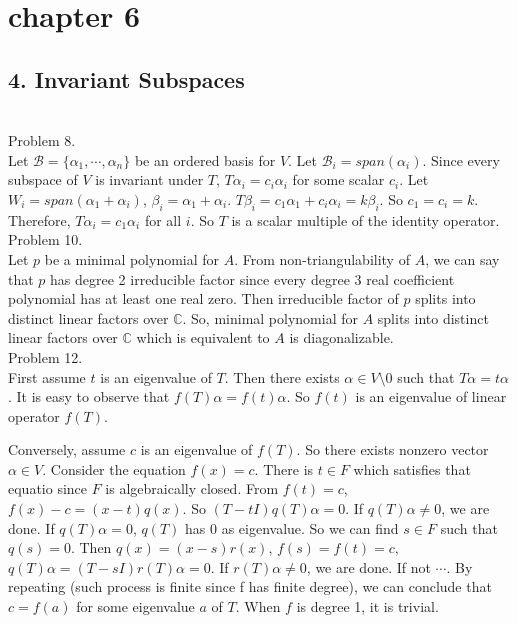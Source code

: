 \section*{chapter 6}
    \subsection*{4. Invariant Subspaces}\hfill \\

    Problem 8. \\

    Let $\mathcal{B} = \{ \alpha_1, \cdots, \alpha_n \}$ be an ordered basis for $V$.
    Let $\mathcal{B}_i = span(\alpha_i)$.
    Since every subspace of $V$ is invariant under $T$, $T \alpha_i = c_i \alpha_i$ for some scalar $c_i$.
    Let $W_i = span(\alpha_1 + \alpha_i)$, $\beta_i = \alpha_1 + \alpha_i$.
    $T \beta_i = c_1 \alpha_1 + c_i \alpha_i = k\beta_i$. So $c_1 = c_i = k$.
    Therefore, $T \alpha_i = c_1 \alpha_i$ for all $i$. So $T$ is a scalar multiple of the identity operator.\\

    Problem 10. \\

    Let $p$ be a minimal polynomial for $A$.
    From non-triangulability of $A$, we can say that $p$ has degree 2 irreducible factor since every degree 3 real coefficient polynomial has at least one real zero.
    Then irreducible factor of $p$ splits into distinct linear factors over $\mathbb{C}$.
    So, minimal polynomial for $A$ splits into distinct linear factors over $\mathbb{C}$ which is equivalent to $A$ is diagonalizable.\\

    Problem 12. \\

    First assume $t$ is an eigenvalue of $T$. Then there exists $\alpha \in V \setminus 0$
    such that $T\alpha = t\alpha$. It is easy to observe that $f(T)\alpha = f(t)\alpha$.
    So $f(t)$ is an eigenvalue of linear operator $f(T)$.

    Conversely, assume $c$ is an eigenvalue of $f(T)$. So there exists nonzero vector $\alpha \in V$.
    Consider the equation $f(x) = c$. There is $t \in F$ which satisfies that equatio since $F$ is algebraically closed.
    From $f(t) = c$, $f(x) - c = (x-t)q(x)$. So $(T-tI)q(T)\alpha = 0$. If $q(T)\alpha \ne 0$, we are done.
    If $q(T)\alpha = 0$, $q(T)$ has $0$ as eigenvalue. So we can find $s \in F$ such that $q(s) = 0$. 
    Then $q(x) = (x-s)r(x)$, $f(s) = f(t) = c$, $q(T)\alpha = (T-sI)r(T)\alpha = 0$. If $r(T)\alpha \ne 0$, we are done.
    If not $\cdots$. By repeating (such process is finite since f has finite degree), we can conclude that 
    $c = f(a)$ for some eigenvalue $a$ of $T$. When $f$ is degree 1, it is trivial.
    

